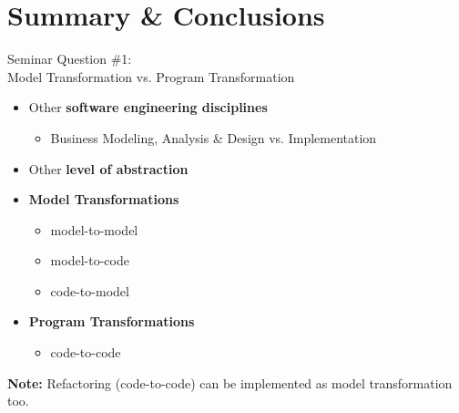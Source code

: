 \documentclass[10pt]{beamer}
\begin{document}
\section{Summary \& Conclusions}

\begin{frame}{Seminar Question \#1: \\Model Transformation vs. Program Transformation}

	\begin{itemize}
		\item Other \textbf{software engineering disciplines}
		\begin{itemize}
			\item Business Modeling, Analysis \& Design vs. Implementation
		\end{itemize}
		\item Other \textbf{level of abstraction}
	\end{itemize}
	
	\begin{itemize}
		\item \textbf{Model Transformations}
		\begin{itemize}
			\item model-to-model
			\item model-to-code
			\item code-to-model
		\end{itemize}
		\item \textbf{Program Transformations}
		\begin{itemize}
			\item code-to-code
		\end{itemize}
	\end{itemize}
	
	\textbf{Note:} Refactoring (code-to-code) can be implemented as model transformation too.

\end{frame}
\end{document}
